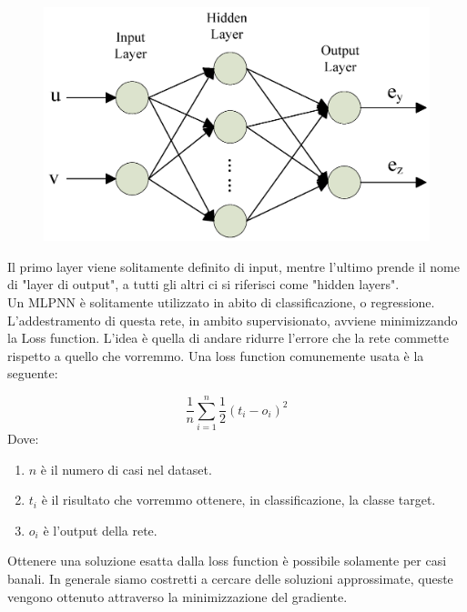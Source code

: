 \documentclass[12pt]{article}
\begin{document}
\begin{figure}[H]{}
    \centering
    \includegraphics[scale=0.8]{../images/mlpnn.png}
    \label{fig:cc}
\end{figure}

Il primo layer viene solitamente definito di input, mentre
l'ultimo prende il nome di "layer di output", a tutti gli
altri ci si riferisci come "hidden layers".\\

Un MLPNN è solitamente utilizzato in abito di classificazione,
o regressione.\\

L'addestramento di questa rete, in ambito supervisionato, avviene 
minimizzando la Loss function. L'idea è quella di andare
ridurre l'errore che la rete commette rispetto a quello che vorremmo.
Una loss function comunemente usata è la seguente:

\begin{equation}
\frac{1}{n}\sum_{i=1}^{n} \frac{1}{2}(t_i-o_i)^2 
\end{equation}
Dove:
\begin{enumerate}
    \item $n$ è il numero di casi nel dataset.
    \item $t_i$ è il risultato che vorremmo ottenere, in classificazione, la classe target.
    \item $o_i$ è l'output della rete.
\end{enumerate}

Ottenere una soluzione esatta dalla loss function è possibile
solamente per casi banali. In generale siamo costretti 
a cercare delle soluzioni approssimate, queste vengono ottenuto
attraverso la minimizzazione del gradiente.\\
\end{document}
